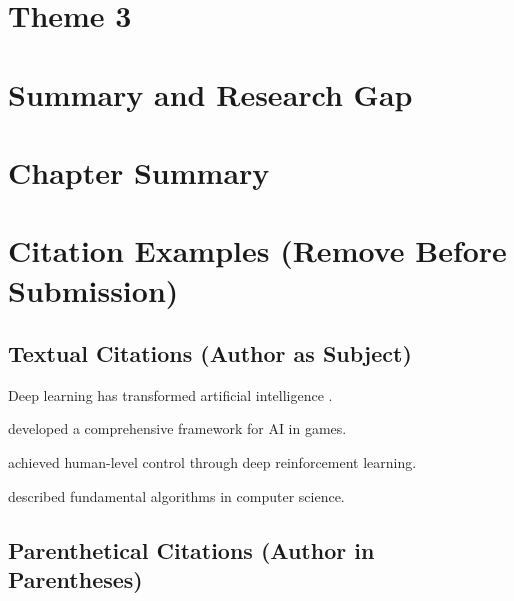 \section{Theme 3}

\section{Summary and Research Gap}

\section{Chapter Summary}


\section*{Citation Examples (Remove Before Submission)}

\subsection*{Textual Citations (Author as Subject)}

Deep learning has transformed artificial intelligence \textcite{lecun2015deep}.

\textcite{yannakakis2018game} developed a comprehensive framework for AI in games.

\textcite{mnih2015atari} achieved human-level control through deep reinforcement learning.

\textcite{knuth1997art} described fundamental algorithms in computer science.

\subsection*{Parenthetical Citations (Author in Parentheses)}

